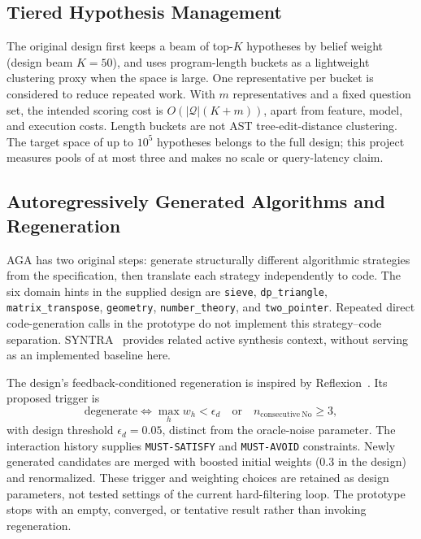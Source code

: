 \subsection{Tiered Hypothesis Management}\label{sec:method:tiered}
The original design first keeps a beam of top-$K$ hypotheses by belief weight (design beam $K=50$), and uses program-length buckets as a lightweight clustering proxy when the space is large. One representative per bucket is considered to reduce repeated work. With $m$ representatives and a fixed question set, the intended scoring cost is $O(|\mathcal Q|(K+m))$, apart from feature, model, and execution costs. Length buckets are not AST tree-edit-distance clustering. The target space of up to $10^5$ hypotheses belongs to the full design; this project measures pools of at most three and makes no scale or query-latency claim.

\subsection{Autoregressively Generated Algorithms and Regeneration}\label{sec:method:aga}
AGA has two original steps: generate structurally different algorithmic strategies from the specification, then translate each strategy independently to code. The six domain hints in the supplied design are \texttt{sieve}, \texttt{dp\_triangle}, \texttt{matrix\_transpose}, \texttt{geometry}, \texttt{number\_theory}, and \texttt{two\_pointer}. Repeated direct code-generation calls in the prototype do not implement this strategy--code separation. SYNTRA~\cite{syntra} provides related active synthesis context, without serving as an implemented baseline here.

The design's feedback-conditioned regeneration is inspired by Reflexion~\cite{reflexion}. Its proposed trigger is
\begin{equation}
 \mathrm{degenerate}\iff\max_h w_h<\epsilon_d\quad\mathrm{or}\quad n_{\mathrm{consecutive\ No}}\geq3,
\end{equation}
with design threshold $\epsilon_d=0.05$, distinct from the oracle-noise parameter. The interaction history supplies \texttt{MUST-SATISFY} and \texttt{MUST-AVOID} constraints. Newly generated candidates are merged with boosted initial weights (0.3 in the design) and renormalized. These trigger and weighting choices are retained as design parameters, not tested settings of the current hard-filtering loop. The prototype stops with an empty, converged, or tentative result rather than invoking regeneration.


